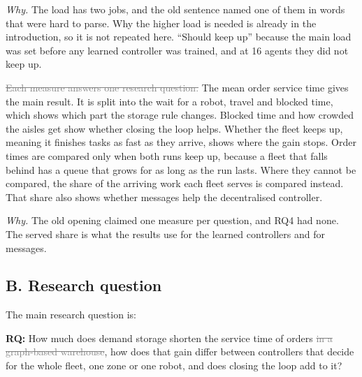 \documentclass[11pt,a4paper]{article}
\newcommand{\new}[1]{\textcolor{newc}{#1}}
\newcommand{\old}[1]{\textcolor{gray}{\sout{#1}}}
\newcommand{\why}[1]{\textcolor{notec}{\small\emph{Why.} #1}\par}
\begin{document}
\why{The load has two jobs, and the old sentence named one of them in words that were hard to parse.
Why the higher load is needed is already in the introduction, so it is not repeated here.
``Should keep up'' because the main load was set before any learned controller was trained, and at
16 agents they did not keep up.}

\old{Each measure answers one research question.} The mean order service time gives the main result.
It is split into the wait for a robot, travel and blocked time, which shows which part the storage
rule changes. Blocked time and how crowded the aisles get show whether closing the loop helps.
Whether the fleet keeps up, meaning it finishes tasks as fast as they arrive, shows where the gain
stops. \new{Order times are compared only when both runs keep up, because a fleet that falls behind
has a queue that grows for as long as the run lasts. Where they cannot be compared, the share of
the arriving work each fleet serves is compared instead. That share also shows whether messages help
the decentralised controller.}

\why{The old opening claimed one measure per question, and RQ4 had none. The served share is what the
results use for the learned controllers and for messages.}

\subsection*{B. Research question}

The main research question is:

\textbf{RQ:} How much does demand storage shorten the service time of orders\old{ in a graph-based
warehouse}, how does that gain differ between controllers that decide for the whole fleet, one zone
or one robot, and does closing the loop add to it?
\end{document}
